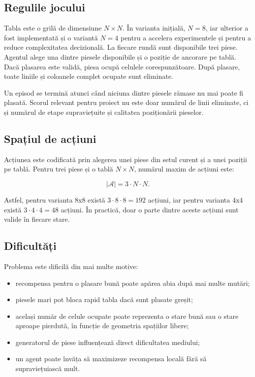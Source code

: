 \documentclass[12pt,a4paper]{article}
\begin{document}
\subsection{Regulile jocului}

Tabla este o grilă de dimensiune $N \times N$. În varianta inițială, $N=8$, iar ulterior a fost implementată și o variantă $N=4$ pentru a accelera experimentele și pentru a reduce complexitatea decizională. La fiecare rundă sunt disponibile trei piese. Agentul alege una dintre piesele disponibile și o poziție de ancorare pe tablă. Dacă plasarea este validă, piesa ocupă celulele corespunzătoare. După plasare, toate liniile și coloanele complet ocupate sunt eliminate.

Un episod se termină atunci când niciuna dintre piesele rămase nu mai poate fi plasată. Scorul relevant pentru proiect nu este doar numărul de linii eliminate, ci și numărul de etape supraviețuite și calitatea poziționării pieselor.

\subsection{Spațiul de acțiuni}

Acțiunea este codificată prin alegerea unei piese din setul curent și a unei poziții pe tablă. Pentru trei piese și o tablă $N \times N$, numărul maxim de acțiuni este:

\begin{equation}
    |\mathcal{A}| = 3 \cdot N \cdot N.
\end{equation}

Astfel, pentru varianta 8x8 există $3 \cdot 8 \cdot 8 = 192$ acțiuni, iar pentru varianta 4x4 există $3 \cdot 4 \cdot 4 = 48$ acțiuni. În practică, doar o parte dintre aceste acțiuni sunt valide în fiecare stare.

\subsection{Dificultăți}

Problema este dificilă din mai multe motive:
\begin{itemize}
    \item recompensa pentru o plasare bună poate apărea abia după mai multe mutări;
    \item piesele mari pot bloca rapid tabla dacă sunt plasate greșit;
    \item același număr de celule ocupate poate reprezenta o stare bună sau o stare aproape pierdută, în funcție de geometria spațiilor libere;
    \item generatorul de piese influențează direct dificultatea mediului;
    \item un agent poate învăța să maximizeze recompensa locală fără să supraviețuiască mult.
\end{itemize}
\end{document}

